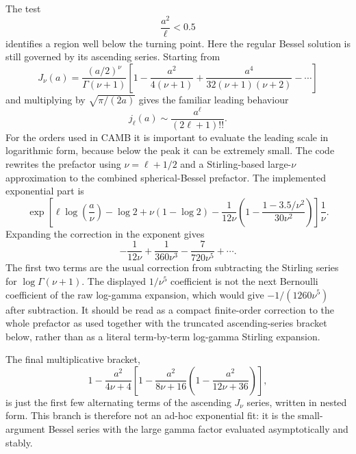\documentclass[11pt,a4paper]{article}
\begin{document}
The test
\begin{equation}
  \frac{a^2}{\ell}<0.5
\end{equation}
identifies a region well below the turning point.  Here the regular Bessel solution is still governed by its ascending series.  Starting from
\begin{equation}
  J_\nu(a)=\frac{(a/2)^\nu}{\Gamma(\nu+1)}
  \left[1-\frac{a^2}{4(\nu+1)}
  +\frac{a^4}{32(\nu+1)(\nu+2)}-\cdots\right]
\end{equation}
and multiplying by $\sqrt{\pi/(2a)}$ gives the familiar leading behaviour
\begin{equation}
  j_\ell(a) \sim \frac{a^\ell}{(2\ell+1)!!} .
\end{equation}
For the orders used in CAMB it is important to evaluate the leading scale in logarithmic form, because below the peak it can be extremely small.  The code rewrites the prefactor using $\nu=\ell+1/2$ and a Stirling-based large-$\nu$ approximation to the combined spherical-Bessel prefactor.  The implemented exponential part is
\begin{equation}
  \exp\left[\ell\log\left(\frac{a}{\nu}\right)-\log2+\nu(1-\log2)
       -\frac{1}{12\nu}\left(1-\frac{1-3.5/\nu^2}{30\nu^2}\right)\right]\frac{1}{\nu} .
\end{equation}
Expanding the correction in the exponent gives
\begin{equation}
  -\frac{1}{12\nu}+\frac{1}{360\nu^3}-\frac{7}{720\nu^5}+\cdots .
\end{equation}
The first two terms are the usual correction from subtracting the Stirling series for $\log\Gamma(\nu+1)$.  The displayed $1/\nu^5$ coefficient is not the next Bernoulli coefficient of the raw log-gamma expansion, which would give $-1/(1260\nu^5)$ after subtraction.  It should be read as a compact finite-order correction to the whole prefactor as used together with the truncated ascending-series bracket below, rather than as a literal term-by-term log-gamma Stirling expansion.

The final multiplicative bracket,
\begin{equation}
  1-\frac{a^2}{4\nu+4}
      \left[1-\frac{a^2}{8\nu+16}
      \left(1-\frac{a^2}{12\nu+36}\right)\right],
\end{equation}
is just the first few alternating terms of the ascending $J_\nu$ series, written in nested form.  This branch is therefore not an ad-hoc exponential fit: it is the small-argument Bessel series with the large gamma factor evaluated asymptotically and stably.
\end{document}
